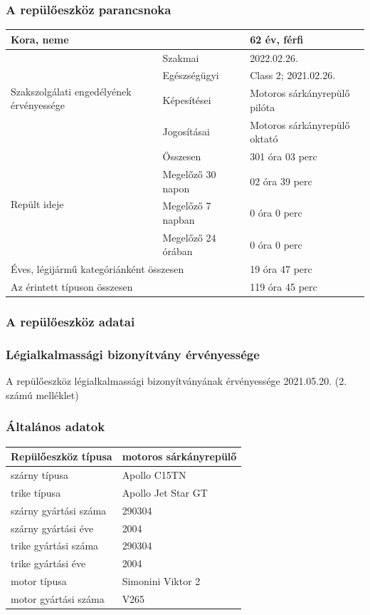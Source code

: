 \documentclass[a4paper,10pt]{article}
\begin{document}
\subsubsection{A repülőeszköz parancsnoka}
\begin{tabular}{|l|l|l|}
\hline
 \multicolumn{2}{|l|}{Kora, neme} & 62 év, férfi\\ \hline
 \multirow{4}{3cm}{Szakszolgálati engedélyének érvényessége}
    & Szakmai & 2022.02.26.\\ \cline{2-3}
    & Egészségügyi & Class 2; 2021.02.26.\\ \cline{2-3}
    & Képesítései & Motoros sárkányrepülő pilóta\\ \cline{2-3}
    & Jogosításai & Motoros sárkányrepülő oktató\\ \cline{2-3}
 \hline 
 \multirow{4}{3cm}{Repült ideje}
    & Összesen & 301 óra 03 perc\\ \cline{2-3}
    & Megelőző 30 napon & 02 óra 39 perc\\ \cline{2-3}
    & Megelőző 7 napban & 0 óra 0 perc\\ \cline{2-3}
    & Megelőző 24 órában & 0 óra 0 perc\\ \cline{2-3}
 \hline
 \multicolumn{2}{|l|}{Éves, légijármű kategóriánként összesen} & 19 óra 47 
perc\\ \hline
 \multicolumn{2}{|l|}{Az érintett típuson összesen} & 119 óra 45 perc\\ \hline
\end{tabular}

\subsubsection{A repülőeszköz adatai}
\subsubsection{Légialkalmassági bizonyítvány érvényessége}
A repülőeszköz légialkalmassági bizonyítványának érvényessége 2021.05.20.
(2. számú melléklet)

\subsubsection{Általános adatok}
\begin{tabular}{|l|l|}
 \hline
 Repülőeszköz típusa & motoros sárkányrepülő\\ \hline
 szárny típusa & Apollo C15TN\\ \hline
 trike típusa & Apollo Jet Star GT\\ \hline
 szárny gyártási száma & 290304\\ \hline
 szárny gyártási éve & 2004\\ \hline
 trike gyártási száma & 290304\\ \hline
 trike gyártási éve & 2004\\ \hline
 motor típusa & Simonini Viktor 2\\ \hline
 motor gyártási száma & V265\\ \hline
\end{tabular}
\end{document}
